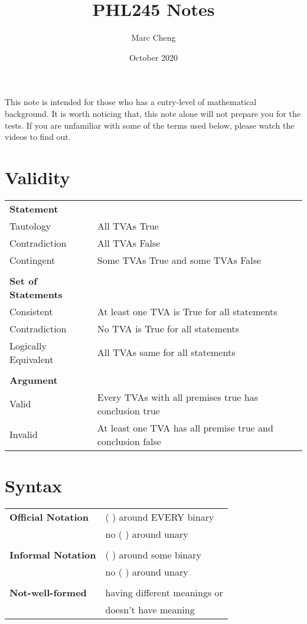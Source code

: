 \documentclass{article}
\title{PHL245 Notes}
\author{Marc Cheng}
\date{October 2020}
\begin{document}
\maketitle

This note is intended for those who has a entry-level of mathematical background. It is worth noticing that, this note alone will not prepare you for the tests. If you are unfamiliar with some of the terms used below, please watch the videos to find out.

\section{Validity}
\begin{tabular}{ll}
    \textbf{Statement} & \\
    Tautology & All TVAs True\\
    Contradiction & All TVAs False\\
    Contingent & Some TVAs True and some TVAs False\\
    & \\
    \textbf{Set of Statements} & \\
    Consistent & At least one TVA is True for all statements\\
    Contradiction & No TVA is True for all statements\\
    Logically Equivalent & All TVAs same for all statements\\
    & \\
    \textbf{Argument} & \\
    Valid & Every TVAs with all premises true has conclusion true\\
    Invalid & At least one TVA has all premise true and conclusion false\\
\end{tabular}


\section{Syntax}
\begin{tabular}{ll}
\textbf{Official Notation} &  ( ) around EVERY binary\\
& no ( ) around unary\\
\\
\textbf{Informal Notation} & ( ) around some binary\\
& no ( ) around unary\\
\\
\textbf{Not-well-formed} & having different meanings or \\
& doesn't have meaning\\
\end{tabular} 
\end{document}
